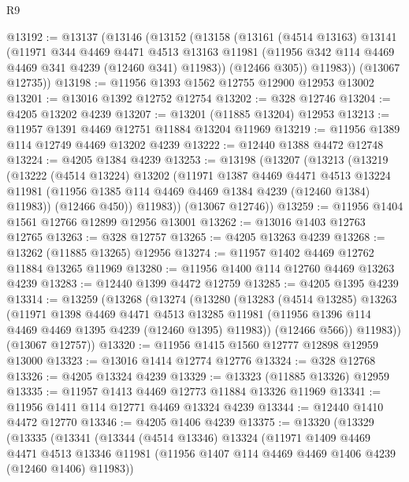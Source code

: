 \begin{lexlean}{R9}
\begin{coremodule}
@13192 := @13137
    (@13146
      (@13152
        (@13158
          (@13161
            (@4514 @13163)
            @13141
            (@11971
              @344
              @4469
              @4471
              @4513
              @13163
              @11981
              (@11956 @342 @114 @4469 @4469 @341 @4239 (@12460 @341) @11983))
            (@12466 @305))
          @11983))
      (@13067 @12735))
@13198 := @11956 @1393 @1562 @12755 @12900 @12953 @13002
@13201 := @13016 @1392 @12752 @12754
@13202 := @328 @12746
@13204 := @4205 @13202 @4239
@13207 := @13201 (@11885 @13204) @12953
@13213 := @11957 @1391 @4469 @12751 @11884 @13204 @11969
@13219 := @11956 @1389 @114 @12749 @4469 @13202 @4239
@13222 := @12440 @1388 @4472 @12748
@13224 := @4205 @1384 @4239
@13253 := @13198
    (@13207
      (@13213
        (@13219
          (@13222
            (@4514 @13224)
            @13202
            (@11971
              @1387
              @4469
              @4471
              @4513
              @13224
              @11981
              (@11956 @1385 @114 @4469 @4469 @1384 @4239 (@12460 @1384) @11983))
            (@12466 @450))
          @11983))
      (@13067 @12746))
@13259 := @11956 @1404 @1561 @12766 @12899 @12956 @13001
@13262 := @13016 @1403 @12763 @12765
@13263 := @328 @12757
@13265 := @4205 @13263 @4239
@13268 := @13262 (@11885 @13265) @12956
@13274 := @11957 @1402 @4469 @12762 @11884 @13265 @11969
@13280 := @11956 @1400 @114 @12760 @4469 @13263 @4239
@13283 := @12440 @1399 @4472 @12759
@13285 := @4205 @1395 @4239
@13314 := @13259
    (@13268
      (@13274
        (@13280
          (@13283
            (@4514 @13285)
            @13263
            (@11971
              @1398
              @4469
              @4471
              @4513
              @13285
              @11981
              (@11956 @1396 @114 @4469 @4469 @1395 @4239 (@12460 @1395) @11983))
            (@12466 @566))
          @11983))
      (@13067 @12757))
@13320 := @11956 @1415 @1560 @12777 @12898 @12959 @13000
@13323 := @13016 @1414 @12774 @12776
@13324 := @328 @12768
@13326 := @4205 @13324 @4239
@13329 := @13323 (@11885 @13326) @12959
@13335 := @11957 @1413 @4469 @12773 @11884 @13326 @11969
@13341 := @11956 @1411 @114 @12771 @4469 @13324 @4239
@13344 := @12440 @1410 @4472 @12770
@13346 := @4205 @1406 @4239
@13375 := @13320
    (@13329
      (@13335
        (@13341
          (@13344
            (@4514 @13346)
            @13324
            (@11971
              @1409
              @4469
              @4471
              @4513
              @13346
              @11981
              (@11956 @1407 @114 @4469 @4469 @1406 @4239 (@12460 @1406) @11983))

\end{coremodule}
\end{lexlean}
